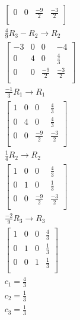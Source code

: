 \documentclass[12pt letter]{report}
\begin{document}
{\begin{align*}
\begin{bmatrix}
      0  & 0  & \frac{-9}{2} & \frac{-3}{2} \\
    \end{bmatrix}
    \\
    \frac{4}{9}R_3 - R_2  \rightarrow R_2                           \\
    \begin{bmatrix}
      -3 & 0 & 0            & -4           \\
      0  & 4 & 0            & \frac{4}{3}  \\
      0  & 0 & \frac{-9}{2} & \frac{-3}{2} \\
    \end{bmatrix}
    \\
    \frac{-1}{3}R_1 \to R_1                                         \\
    \begin{bmatrix}
      1 & 0 & 0            & \frac{4}{3}  \\
      0 & 4 & 0            & \frac{4}{3}  \\
      0 & 0 & \frac{-9}{2} & \frac{-3}{2} \\
    \end{bmatrix}
    \\
    \frac{1}{4}R_2 \to R_2                                          \\
    \begin{bmatrix}
      1 & 0 & 0            & \frac{4}{3}  \\
      0 & 1 & 0            & \frac{1}{3}  \\
      0 & 0 & \frac{-9}{2} & \frac{-3}{2} \\
    \end{bmatrix}
    \\
    \frac{-2}{9}R_3 \to R_3                                         \\
    \begin{bmatrix}
      1 & 0 & 0 & \frac{4}{3} \\
      0 & 1 & 0 & \frac{1}{3} \\
      0 & 0 & 1 & \frac{1}{3} \\
    \end{bmatrix}                                         \\
    c_1 = \frac{4}{3}                                               \\
    c_2 = \frac{1}{3}                                               \\
    c_3 = \frac{1}{3}                                               \\

\end{align*}}
\end{document}
